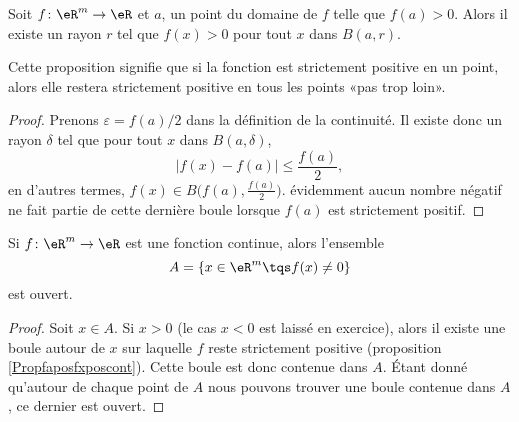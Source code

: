 \begin{proposition}		\label{Propfaposfxposcont}
	Soit $f\colon \eR^m\to \eR$ et $a$, un point du domaine de $f$ telle que $f(a)>0$. Alors il existe un rayon $r$ tel que $f(x)>0$ pour tout $x$ dans $B(a,r)$.
\end{proposition}
Cette proposition signifie que si la fonction est strictement positive en un point, alors elle restera strictement positive en tous les points «pas trop loin».

\begin{proof}
	Prenons $\varepsilon=f(a)/2$ dans la définition de la continuité. Il existe donc un rayon $\delta$ tel que pour tout $x$ dans $B(a,\delta)$,
	\begin{equation}
		| f(x)-f(a) |\leq \frac{ f(a) }{2},
	\end{equation}
	en d'autres termes, $f(x)\in B\big( f(a),\frac{ f(a) }{ 2 } \big)$. évidemment aucun nombre négatif ne fait partie de cette dernière boule lorsque $f(a)$ est strictement positif.
\end{proof}

\begin{corollary}		\label{CorfneqzOuvert}
	Si $f\colon \eR^m\to \eR$ est une fonction continue, alors l'ensemble
	\begin{equation}
		A=\{ x\in\eR^m\tqs f(x)\neq 0 \}
	\end{equation}
	est ouvert.
\end{corollary}

\begin{proof}
	Soit $x\in A$. Si $x>0$ (le cas $x<0$ est laissé en exercice), alors il existe une boule autour de $x$ sur laquelle $f$ reste strictement positive (proposition \ref{Propfaposfxposcont}). Cette boule est donc contenue dans $A$. Étant donné qu'autour de chaque point de $A$ nous pouvons trouver une boule contenue dans $A$, ce dernier est ouvert.
\end{proof}

